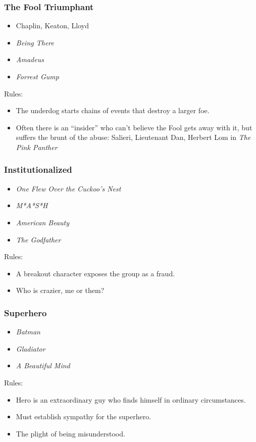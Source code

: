 \documentclass{beamer}
\newcommand{\bi}{\begin{itemize}}
\newcommand{\ei}{\end{itemize}}
\begin{document}
\begin{frame}\frametitle{The Fool Triumphant}
\bi
\item Chaplin, Keaton, Lloyd
\item {\sl Being There}
\item {\sl Amadeus}
\item {\sl Forrest Gump}
\ei
Rules:
\bi
\item The underdog starts chains of events that destroy a larger foe.
\item Often there is an ``insider'' who can't believe the Fool
gets away with it, but suffers the brunt of the abuse:
Salieri, Lieutenant Dan, Herbert Lom in {\em The Pink Panther}
\ei


\end{frame}
\begin{frame}\frametitle{Institutionalized}
\bi
\item {\sl One Flew Over the Cuckoo's Nest}
\item {\sl M*A*S*H}
\item {\sl American Beauty}
\item {\sl The Godfather}
\ei 
Rules:
\bi
\item A breakout character exposes the group as a fraud.
\item Who is crazier, me or them?
\ei

\end{frame}
\begin{frame}\frametitle{Superhero}
\bi
\item {\sl Batman}
\item {\sl Gladiator}
\item {\sl A Beautiful Mind}
\ei
Rules:
\bi
\item Hero is an extraordinary guy who finds himself in ordinary
circumstances. 
\item Must establish sympathy for the superhero.
\item The plight of being misunderstood.
\ei

\end{frame}
\end{document}
